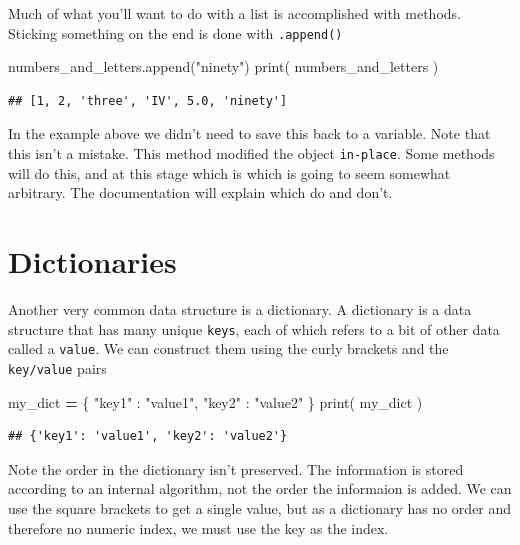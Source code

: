 \documentclass[]{book}
\newenvironment{Shaded}{\begin{snugshade}}{\end{snugshade}}
\newcommand{\BuiltInTok}[1]{#1}
\newcommand{\NormalTok}[1]{#1}
\newcommand{\OperatorTok}[1]{\textcolor[rgb]{0.81,0.36,0.00}{\textbf{#1}}}
\newcommand{\StringTok}[1]{\textcolor[rgb]{0.31,0.60,0.02}{#1}}
\theoremstyle{definition}
\theoremstyle{definition}
\theoremstyle{definition}
\theoremstyle{remark}
\let\BeginKnitrBlock\begin \let\EndKnitrBlock\end
\begin{document}
Much of what you'll want to do with a list is accomplished with methods.
Sticking something on the end is done with \texttt{.append()}

\begin{Shaded}
\begin{Highlighting}[]
\NormalTok{numbers_and_letters.append(}\StringTok{"ninety"}\NormalTok{)}
\BuiltInTok{print}\NormalTok{( numbers_and_letters )}
\end{Highlighting}
\end{Shaded}

\begin{verbatim}
## [1, 2, 'three', 'IV', 5.0, 'ninety']
\end{verbatim}

\BeginKnitrBlock{reader}
In the example above we didn't need to save this back to a variable.
Note that this isn't a mistake. This method modified the object
\texttt{in-place}. Some methods will do this, and at this stage which is
which is going to seem somewhat arbitrary. The documentation will
explain which do and don't.
\EndKnitrBlock{reader}

\hypertarget{dictionaries}{%
\section{Dictionaries}\label{dictionaries}}

Another very common data structure is a dictionary. A dictionary is a
data structure that has many unique \texttt{keys}, each of which refers
to a bit of other data called a \texttt{value}. We can construct them
using the curly brackets and the \texttt{key/value} pairs

\begin{Shaded}
\begin{Highlighting}[]
\NormalTok{my_dict }\OperatorTok{=}\NormalTok{ \{}
  \StringTok{"key1"}\NormalTok{ : }\StringTok{"value1"}\NormalTok{,}
  \StringTok{"key2"}\NormalTok{ : }\StringTok{"value2"}
\NormalTok{\}}
\BuiltInTok{print}\NormalTok{( my_dict )}
\end{Highlighting}
\end{Shaded}

\begin{verbatim}
## {'key1': 'value1', 'key2': 'value2'}
\end{verbatim}

Note the order in the dictionary isn't preserved. The information is
stored according to an internal algorithm, not the order the informaion
is added. We can use the square brackets to get a single value, but as a
dictionary has no order and therefore no numeric index, we must use the
key as the index.
\end{document}
